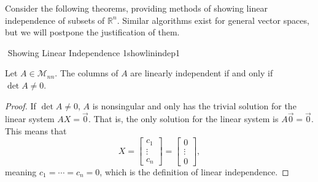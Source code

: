         Consider the following theorems, providing methods of showing linear independence of subsets of \(\mathbb{R}^n\). Similar algorithms exist for general vector spaces, but we will postpone the justification of them.
        \begin{theorem}{\Stop\,\,Showing Linear Independence 1}{showlinindep1}

           Let \(A\in\mathcal{M}_{nn}\). The columns of \(A\) are linearly independent if and only if \(\det A \neq 0\).
           \begin{proof}
                If \(\det A\neq0\), \(A\) is nonsingular and only has the trivial solution for the linear system \(AX=\vec{0}\). That is, the only solution for the linear system is \(A\vec{0}=\vec{0}\). This means that
                \begin{equation*}
                    X
                    =
                    \begin{bmatrix}
                        c_1 \\ \vdots \\ c_n 
                    \end{bmatrix} 
                    =
                    \begin{bmatrix}
                        0\\ \vdots \\ 0
                    \end{bmatrix},
                \end{equation*}
                meaning \(c_1=\cdots=c_n=0\), which is the definition of linear independence.
           \end{proof}
            
        \end{theorem}
        \pagebreak
